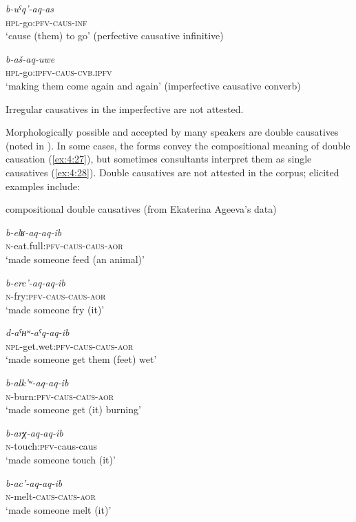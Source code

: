 \documentclass[output=paper]{langsci/langscibook}
\begin{document}
\ex %
\gll \emph{b-uˤq'-aq-as}\\
\textsc{hpl}-go:\textsc{pfv}-\textsc{caus}-\textsc{inf}\\
\glt `cause (them) to go' (perfective causative infinitive)

\ex %
\gll \emph{b-aš-aq-uwe}\\
\textsc{hpl}-go:\textsc{ipfv}-\textsc{caus}-\textsc{cvb.ipfv}\\
\glt `making them come again and again' (imperfective causative converb)
\z
\z

Irregular causatives in the imperfective are not attested.

Morphologically possible and accepted by many speakers are double
causatives (noted in \citealt{ageeva2014}). In some cases, the forms convey the
compositional meaning of double causation (\ref{ex:4:27}), but sometimes
consultants interpret them as single causatives (\ref{ex:4:28}). Double causatives
are not attested in the corpus; elicited examples include:

\ea \label{ex:4:27} %
compositional double causatives (from Ekaterina Ageeva's
data)

\ea %
\gll \emph{b-elʁ-aq-aq-ib}\\
\textsc{n}-eat.full:\textsc{pfv}-\textsc{caus}-\textsc{caus}-\textsc{aor}\\
\glt `made someone feed (an animal)'

\ex %
\gll \emph{b-erc'-aq-aq-ib}\\
\textsc{n}-fry:\textsc{pfv}-\textsc{caus}-\textsc{caus}-\textsc{aor}\\
\glt `made someone fry (it)'

\ex %
\gll\emph{d-aˤʜʷ-aˤq-aq-ib}\\
    \textsc{npl}-get.wet:\textsc{pfv}-\textsc{caus}-\textsc{caus}-\textsc{aor}\\
\glt `made someone get them (feet) wet'

\ex %
\gll \emph{b-alk'ʷ-aq-aq-ib}\\
  \textsc{n}-burn:\textsc{pfv}-\textsc{caus}-\textsc{caus}-\textsc{aor}\\
  \glt `made someone get (it) burning'

\ex %
\gll \emph{b-arχ-aq-aq-ib}\\
    \textsc{n}-touch:\textsc{pfv}-caus-caus\\
\glt `made someone touch (it)'

\ex %
\gll\emph{b-ac'-aq-aq-ib}\\
  \textsc{n}-melt-\textsc{caus}-\textsc{caus}-\textsc{aor}\\
  \glt `made someone melt (it)'
\z
\end{document}
